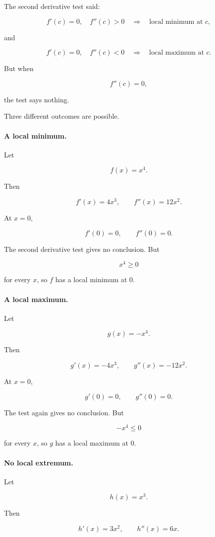 The second derivative test said:

\[
f'(c)=0,\quad f''(c)>0
\quad\Longrightarrow\quad
\text{local minimum at }c,
\]

and

\[
f'(c)=0,\quad f''(c)<0
\quad\Longrightarrow\quad
\text{local maximum at }c.
\]

But when

\[
f''(c)=0,
\]

the test says nothing.

Three different outcomes are possible.

\paragraph{A local minimum.}
Let

\[
f(x)=x^4.
\]

Then

\[
f'(x)=4x^3,
\qquad
f''(x)=12x^2.
\]

At \(x=0\),

\[
f'(0)=0,
\qquad
f''(0)=0.
\]

The second derivative test gives no conclusion.  But

\[
x^4\ge0
\]

for every \(x\), so \(f\) has a local minimum at \(0\).

\paragraph{A local maximum.}
Let

\[
g(x)=-x^4.
\]

Then

\[
g'(x)=-4x^3,
\qquad
g''(x)=-12x^2.
\]

At \(x=0\),

\[
g'(0)=0,
\qquad
g''(0)=0.
\]

The test again gives no conclusion.  But

\[
-x^4\le0
\]

for every \(x\), so \(g\) has a local maximum at \(0\).

\paragraph{No local extremum.}
Let

\[
h(x)=x^3.
\]

Then

\[
h'(x)=3x^2,
\qquad
h''(x)=6x.
\]

